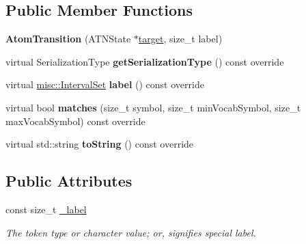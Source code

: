 \subsection*{Public Member Functions}
\begin{DoxyCompactItemize}
\item 
\mbox{\label{classantlr4_1_1atn_1_1AtomTransition_af69d81cfb163080e0c98b620b8cb66a7}} 
{\bfseries Atom\+Transition} (A\+T\+N\+State $\ast$\hyperlink{classantlr4_1_1atn_1_1Transition_aaaed7f4ddda71e156b36de33e88f66a7}{target}, size\+\_\+t label)
\item 
\mbox{\label{classantlr4_1_1atn_1_1AtomTransition_aa02c1811edfef1f09fe06e3310e7c1f5}} 
virtual Serialization\+Type {\bfseries get\+Serialization\+Type} () const override
\item 
\mbox{\label{classantlr4_1_1atn_1_1AtomTransition_aa9a089ea07ee3667d4c2b8a9c9b1637e}} 
virtual \hyperlink{classantlr4_1_1misc_1_1IntervalSet}{misc\+::\+Interval\+Set} {\bfseries label} () const override
\item 
\mbox{\label{classantlr4_1_1atn_1_1AtomTransition_aceb4171c2bb81125de577e2c84c82778}} 
virtual bool {\bfseries matches} (size\+\_\+t symbol, size\+\_\+t min\+Vocab\+Symbol, size\+\_\+t max\+Vocab\+Symbol) const override
\item 
\mbox{\label{classantlr4_1_1atn_1_1AtomTransition_a2d9e71455e1ebfb9f878cb5dfa92ed96}} 
virtual std\+::string {\bfseries to\+String} () const override
\end{DoxyCompactItemize}
\subsection*{Public Attributes}
\begin{DoxyCompactItemize}
\item 
\mbox{\label{classantlr4_1_1atn_1_1AtomTransition_ac793fab5323d347fe2b7c159c9b9c556}} 
const size\+\_\+t \hyperlink{classantlr4_1_1atn_1_1AtomTransition_ac793fab5323d347fe2b7c159c9b9c556}{\+\_\+label}
\begin{DoxyCompactList}\small\item\em The token type or character value; or, signifies special label. \end{DoxyCompactList}\end{DoxyCompactItemize}
